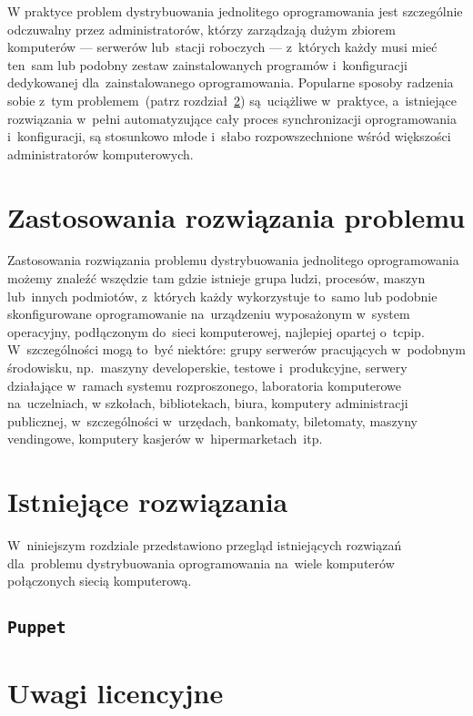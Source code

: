 \documentclass[thesis]{subfiles}
\begin{document}
W praktyce problem dystrybuowania jednolitego oprogramowania jest szczególnie odczuwalny przez administratorów, którzy zarządzają dużym zbiorem komputerów --- serwerów lub~stacji roboczych --- z~których każdy musi mieć ten~sam lub podobny zestaw zainstalowanych programów i~konfiguracji dedykowanej dla~zainstalowanego oprogramowania. Popularne sposoby radzenia sobie z~tym problemem~(patrz rozdział~\ref{sec:istniejace-rozwiazania}) są~uciążliwe w~praktyce, a~istniejące rozwiązania w~pełni automatyzujące cały proces synchronizacji oprogramowania i~konfiguracji, są stosunkowo młode i~słabo rozpowszechnione wśród większości administratorów komputerowych.

\section{Zastosowania rozwiązania problemu}

Zastosowania rozwiązania problemu dystrybuowania jednolitego oprogramowania możemy znaleźć wszędzie tam gdzie istnieje grupa ludzi, procesów, maszyn lub~innych podmiotów, z~których każdy wykorzystuje to~samo lub podobnie skonfigurowane oprogramowanie na~urządzeniu wyposażonym w~system operacyjny, podłączonym do~sieci komputerowej, najlepiej opartej o~\gls{tcpip}. W~szczególności mogą to~być niektóre: grupy serwerów pracujących w~podobnym środowisku, np.~maszyny developerskie, testowe i~produkcyjne, serwery działające w~ramach systemu rozproszonego, laboratoria komputerowe na~uczelniach, w szkołach, bibliotekach, biura, komputery administracji publicznej, w~szczególności w~urzędach, bankomaty, biletomaty, maszyny vendingowe, komputery kasjerów w~hipermarketach~itp.

\section{Istniejące rozwiązania}
\label{sec:istniejace-rozwiazania}

W~niniejszym rozdziale przedstawiono przegląd istniejących rozwiązań dla~problemu dystrybuowania oprogramowania na~wiele komputerów połączonych siecią komputerową.

\subsection{\texttt{Puppet}}

\section{Uwagi licencyjne}
\end{document}
